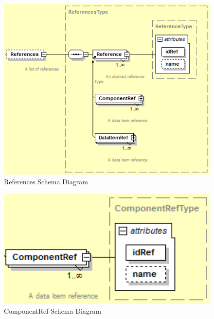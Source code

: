 \begin{figure}[ht]
  \centering
    \includegraphics[width=1.0\textwidth]{figures/References Schema.png}
  \caption{References Schema Diagram}
  \label{fig:References Schema Diagram}
\end{figure}

\FloatBarrier


\begin{figure}[ht]
  \centering
    \includegraphics[width=1.0\textwidth]{figures/ComponentRef Schema.png}
  \caption{ComponentRef Schema Diagram}
  \label{fig:ComponentRef Schema Diagram}
\end{figure}

\FloatBarrier



